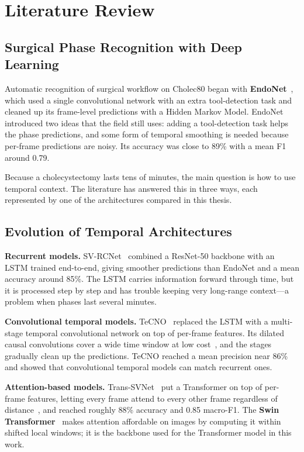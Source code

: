 \documentclass[11pt,a4paper]{report}
\begin{document}
\chapter{Literature Review}

\section{Surgical Phase Recognition with Deep Learning}

Automatic recognition of surgical workflow on Cholec80 began with \textbf{EndoNet}~\cite{twinanda2017endonet}, which used a single convolutional network with an extra tool-detection task and cleaned up its frame-level predictions with a Hidden Markov Model. EndoNet introduced two ideas that the field still uses: adding a tool-detection task helps the phase predictions, and some form of temporal smoothing is needed because per-frame predictions are noisy. Its accuracy was close to 89\% with a mean F1 around 0.79.

Because a cholecystectomy lasts tens of minutes, the main question is how to use temporal context. The literature has answered this in three ways, each represented by one of the architectures compared in this thesis.

\section{Evolution of Temporal Architectures}

\textbf{Recurrent models.} SV-RCNet~\cite{jin2018svrcnet} combined a ResNet-50 backbone with an LSTM trained end-to-end, giving smoother predictions than EndoNet and a mean accuracy around 85\%. The LSTM carries information forward through time, but it is processed step by step and has trouble keeping very long-range context---a problem when phases last several minutes.

\textbf{Convolutional temporal models.} TeCNO~\cite{czempiel2020tecno} replaced the LSTM with a multi-stage temporal convolutional network on top of per-frame features. Its dilated causal convolutions cover a wide time window at low cost~\cite{lea2017temporal}, and the stages gradually clean up the predictions. TeCNO reached a mean precision near 86\% and showed that convolutional temporal models can match recurrent ones.

\textbf{Attention-based models.} Trans-SVNet~\cite{gao2021transsvnet} put a Transformer on top of per-frame features, letting every frame attend to every other frame regardless of distance~\cite{vaswani2017attention}, and reached roughly 88\% accuracy and 0.85 macro-F1. The \textbf{Swin Transformer}~\cite{liu2021swin} makes attention affordable on images by computing it within shifted local windows; it is the backbone used for the Transformer model in this work.
\end{document}
